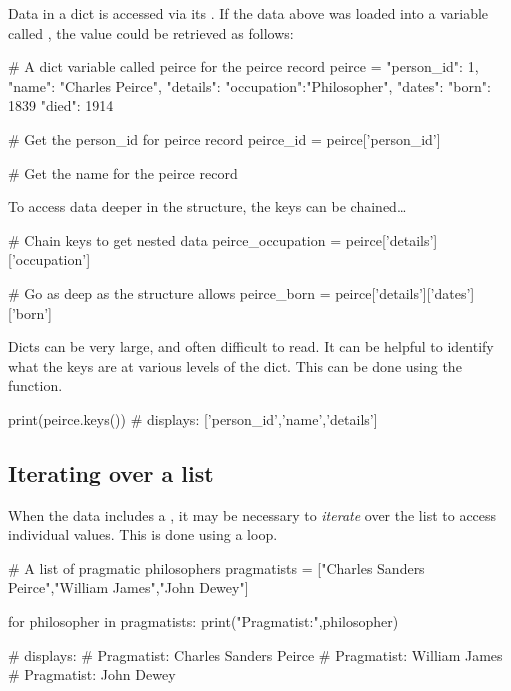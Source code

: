 Data in a dict is accessed via its . If the data above was loaded into a variable called , the  value could be retrieved as follows:

\begin{pycode}
    # A dict variable called peirce for the peirce record
    peirce = {
        "person_id": 1,
        "name": "Charles Peirce",
        "details": {
            "occupation":"Philosopher",
            "dates": {
                "born": 1839
                "died": 1914
            }
        }
    }

    # Get the person_id for peirce record
    peirce_id = peirce['person_id']

    # Get the name for the peirce record
\end{pycode}

To access data deeper in the structure, the keys can be chained\dots

\begin{pycode}
    # Chain keys to get nested data
    peirce_occupation = peirce['details']['occupation']

    # Go as deep as the structure allows
    peirce_born = peirce['details']['dates']['born']
\end{pycode}

Dicts can be very large, and often difficult to read. It can be helpful to identify what the keys are at various levels of the dict. This can be done using the  function.

\begin{pycode}
    print(peirce.keys())
    # displays: ['person_id','name','details']
\end{pycode}

\subsection{Iterating over a list}

When the data includes a , it may be necessary to \textit{iterate} over the list to access individual values. This is done using a  loop.

\begin{pycode}
    # A list of pragmatic philosophers
    pragmatists = ["Charles Sanders Peirce","William James","John Dewey"]

    for philosopher in pragmatists:
        print("Pragmatist:",philosopher)

    # displays:
    # Pragmatist: Charles Sanders Peirce
    # Pragmatist: William James
    # Pragmatist: John Dewey
\end{pycode}

